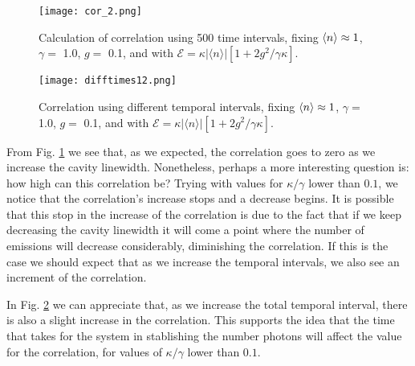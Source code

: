 \documentclass[conference]{IEEEtran}
\begin{document}
\begin{center}
\begin{figure}[t!]
\begin{center}
\texttt{[image: cor\_2.png]}
\caption{\small{Calculation of correlation using 500 time intervals, fixing $\expval{n} \approx 1$, $\gamma =$ 1.0, $g = $ 0.1, and with  $\mathcal{E} =  \kappa |\langle n \rangle|[1 + 2g^2/\gamma \kappa]$.}} \label{corrxy}
\end{center}  
\end{figure}
\end{center}

\begin{center}
\begin{figure}[h!]
\begin{center}
\texttt{[image: difftimes12.png]}
\caption{\small{Correlation using different temporal intervals, fixing $\expval{n} \approx 1$, $\gamma =$ 1.0, $g =$ 0.1, and with  $\mathcal{E} =  \kappa |\langle n \rangle|[1 + 2g^2/\gamma \kappa]$.}}  \label{errorzz}
\end{center}
\end{figure}
\end{center}
From Fig. \ref{corrxy} we see that, as we expected, the correlation goes to zero as we increase the cavity linewidth. Nonetheless, perhaps a more interesting question is: how high can this correlation be? Trying with values for $\kappa/\gamma$ lower than $0.1$, we notice that the correlation's increase stops and a decrease begins. It is possible that this stop in the increase of the correlation is due to the fact that if we keep decreasing the cavity linewidth it will come a point where the number of emissions will decrease considerably, diminishing the correlation. If this is the case we should expect that as we increase the temporal intervals, %
we also see an increment of the correlation.

In Fig. \ref{errorzz} we can appreciate that, as we increase the total temporal interval, there is also a slight increase in the correlation. This supports the idea that the time that takes for the system in stablishing the number photons will affect the value for the correlation, for values of $\kappa/\gamma$ lower than $0.1$.
\end{document}
